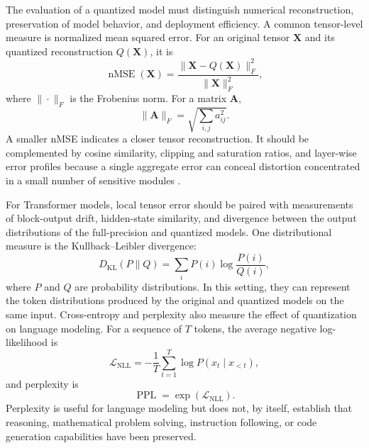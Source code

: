 The evaluation of a quantized model must distinguish numerical
reconstruction, preservation of model behavior, and deployment
efficiency. A common tensor-level measure is normalized mean squared
error. For an original tensor \(\mathbf{X}\) and its quantized
reconstruction \(Q(\mathbf{X})\), it is
\begin{equation}
    \operatorname{nMSE}(\mathbf{X})
    =
    \frac{
        \|\mathbf{X}-Q(\mathbf{X})\|_F^2
    }{
        \|\mathbf{X}\|_F^2
    },
    \label{eq:quant-nmse}
\end{equation}
where \(\|\cdot\|_F\) is the Frobenius norm. For a matrix
\(\mathbf{A}\),
\begin{equation}
    \|\mathbf{A}\|_F
    =
    \sqrt{\sum_{i,j}a_{ij}^2}.
    \label{eq:quant-frobenius}
\end{equation}
A smaller nMSE indicates a closer tensor reconstruction. It should be
complemented by cosine similarity, clipping and saturation ratios,
and layer-wise error profiles because a single aggregate error can
conceal distortion concentrated in a small number of sensitive
modules \parencite{song2026targetcentricqat}.

For Transformer models, local tensor error should be paired with
measurements of block-output drift, hidden-state similarity, and
divergence between the output distributions of the full-precision
and quantized models. One distributional measure is the
Kullback--Leibler divergence:
\begin{equation}
    D_{\mathrm{KL}}(P\|Q)
    =
    \sum_i P(i)\log\frac{P(i)}{Q(i)},
    \label{eq:quant-kl}
\end{equation}
where \(P\) and \(Q\) are probability distributions. In this setting,
they can represent the token distributions produced by the original
and quantized models on the same input. Cross-entropy and perplexity
also measure the effect of quantization on language modeling. For a
sequence of \(T\) tokens, the average negative log-likelihood is
\begin{equation}
    \mathcal{L}_{\mathrm{NLL}}
    =
    -\frac{1}{T}
    \sum_{t=1}^{T}
    \log P(x_t\mid x_{<t}),
    \label{eq:quant-nll}
\end{equation}
and perplexity is
\begin{equation}
    \operatorname{PPL}
    =
    \exp(\mathcal{L}_{\mathrm{NLL}}).
    \label{eq:quant-perplexity}
\end{equation}
Perplexity is useful for language modeling but does not, by itself,
establish that reasoning, mathematical problem solving, instruction
following, or code generation capabilities have been preserved.

